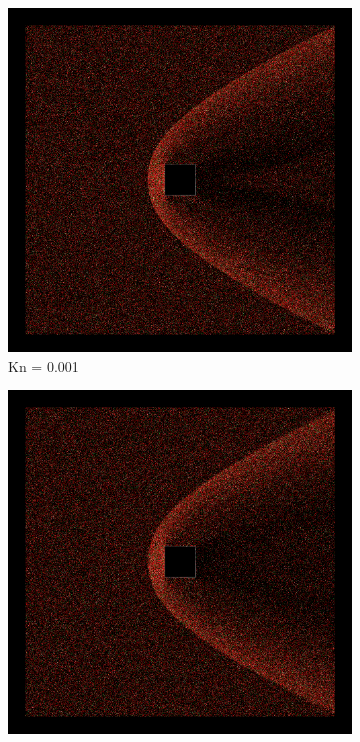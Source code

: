 \begin{figure}
    \centering
    \begin{subfigure}{0.32\textwidth}
        \centering
        \includegraphics[width=\textwidth]{Images/4. Results/Square Kn/particles/Kn0.001.png}
        \caption{Kn = 0.001}
    \end{subfigure}
    \hfill
    \begin{subfigure}{0.32\textwidth}
        \centering
        \includegraphics[width=\textwidth]{Images/4. Results/Square Kn/particles/Kn0.01.png}

\end{subfigure}
\end{figure}
